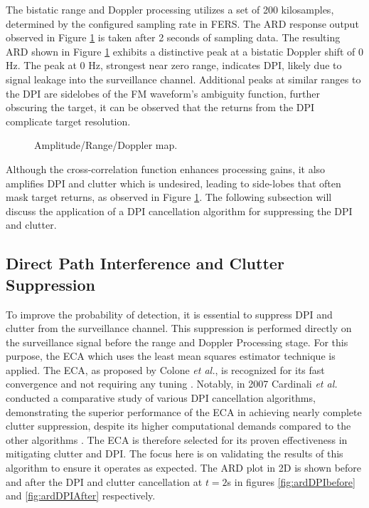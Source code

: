 The bistatic range and Doppler processing utilizes a set of 200 kilosamples, determined by the configured sampling rate in \ac{FERS}. The \ac{ARD} response output observed in Figure \ref{fig:ambiguityFunction} is taken after 2 seconds of sampling data. The resulting \ac{ARD} shown in Figure \ref{fig:ambiguityFunction}  exhibits a distinctive peak at a bistatic Doppler shift of 0 Hz. The peak at 0 Hz, strongest near zero range, indicates \ac{DPI}, likely due to signal leakage into the surveillance channel. Additional peaks at similar ranges to the \ac{DPI} are sidelobes of the \ac{FM} waveform's ambiguity function, further obscuring the target, it can be observed that the returns from the \ac{DPI} complicate target resolution.

\begin{figure}[H]
    \centering
    
    \caption{Amplitude/Range/Doppler map.}
    \label{fig:ambiguityFunction}
\end{figure}
Although the cross-correlation function enhances processing gains, it also amplifies DPI and clutter which is undesired, leading to side-lobes that often mask target returns, as observed in Figure \ref{fig:ambiguityFunction}. The following subsection will discuss the application of a DPI cancellation algorithm for suppressing the \ac{DPI} and clutter.


\subsection{Direct Path Interference and Clutter Suppression}
To improve the probability of detection, it is essential to suppress \ac{DPI} and clutter from the surveillance channel. This suppression is performed directly on the surveillance signal before the range and Doppler Processing stage. For this purpose, the \ac{ECA} which uses the least mean squares estimator technique is applied. The \ac{ECA}, as proposed by Colone \textit{et al.}\cite{coloneECA}, is recognized for its fast convergence and not requiring any tuning \cite{OHagan2008, tong2014}. Notably, in 2007 Cardinali \textit{et al.} conducted a comparative study of various \ac{DPI} cancellation algorithms, demonstrating the superior performance of the \ac{ECA} in achieving nearly complete clutter suppression, despite its higher computational demands compared to the other algorithms \cite{cardinali2007comparison,Heunis2010}. The \ac{ECA} is therefore selected for its proven effectiveness in mitigating clutter and \ac{DPI}. The focus here is on validating the results of this algorithm to ensure it operates as expected. The \ac{ARD} plot in \ac{2D} is shown before and after the DPI and clutter cancellation at \(t=2\)s in figures \ref{fig:ardDPIbefore} and \ref{fig:ardDPIAfter} respectively.

